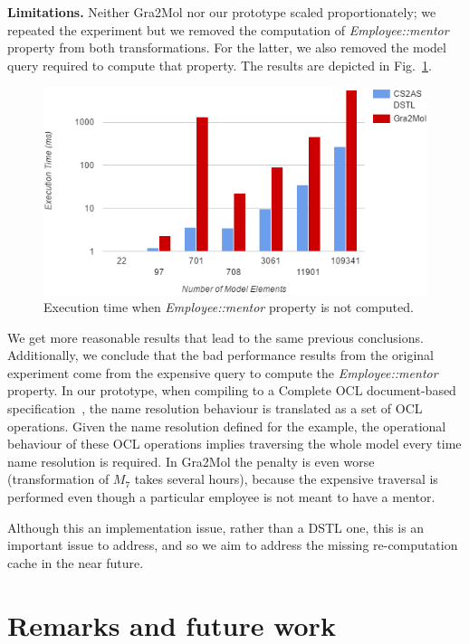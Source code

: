 \documentclass{llncs}
\begin{document}
\textbf{Limitations.} Neither Gra2Mol nor our prototype scaled proportionately; we repeated the experiment but we removed the computation of \textit{Employee::mentor} property from both transformations. For the latter, we also removed the model query required to compute that property. The results are depicted in Fig.~\ref{fig:Results2}.

\begin{figure}[htbp]	
	\centering
	\includegraphics[scale=0.65]{images/Results2.PNG}
	\caption{Execution time when \textit{Employee::mentor} property is not computed.}
	\label{fig:Results2}
\end{figure}

We get more reasonable results that lead to the same previous conclusions. Additionally, we conclude that the bad performance results from the original experiment come from the expensive query to compute the \textit{Employee::mentor} property. In our prototype, when compiling to a Complete OCL document-based specification~\cite{sanchez2015oclCS2AS}, the name resolution behaviour is translated as a set of OCL operations. Given the name resolution defined for the example, the operational behaviour of these OCL operations implies traversing the whole model every time name resolution is required. In Gra2Mol the penalty is even worse (transformation of $M_7$ takes several hours), because the expensive traversal is performed even though a particular employee is not meant to have a mentor.

Although this an implementation issue, rather than a DSTL one, this is an important issue to address, and so we aim to address the missing re-computation cache in the near future.

\section{Remarks and future work}
\label{sec:futureWork}
\end{document}
